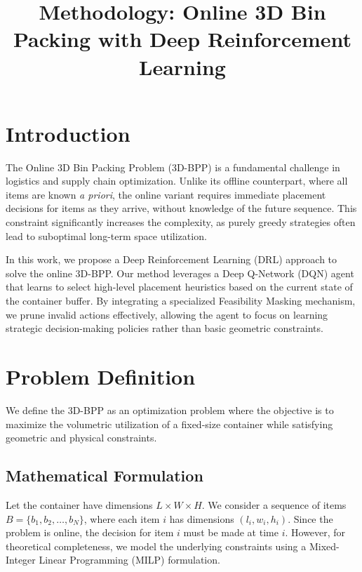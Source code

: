 \documentclass{article}
\title{Methodology: Online 3D Bin Packing with Deep Reinforcement Learning}
\author{}
\date{}
\begin{document}
\maketitle

\section{Introduction}
The Online 3D Bin Packing Problem (3D-BPP) is a fundamental challenge in logistics and supply chain optimization. Unlike its offline counterpart, where all items are known \textit{a priori}, the online variant requires immediate placement decisions for items as they arrive, without knowledge of the future sequence. This constraint significantly increases the complexity, as purely greedy strategies often lead to suboptimal long-term space utilization.

In this work, we propose a Deep Reinforcement Learning (DRL) approach to solve the online 3D-BPP. Our method leverages a Deep Q-Network (DQN) agent that learns to select high-level placement heuristics based on the current state of the container buffer. By integrating a specialized Feasibility Masking mechanism, we prune invalid actions effectively, allowing the agent to focus on learning strategic decision-making policies rather than basic geometric constraints.

\section{Problem Definition}
We define the 3D-BPP as an optimization problem where the objective is to maximize the volumetric utilization of a fixed-size container while satisfying geometric and physical constraints.

\subsection{Mathematical Formulation}
Let the container have dimensions $L \times W \times H$. We consider a sequence of items $B = \{b_1, b_2, \dots, b_N\}$, where each item $i$ has dimensions $(l_i, w_i, h_i)$.
Since the problem is online, the decision for item $i$ must be made at time $i$. However, for theoretical completeness, we model the underlying constraints using a Mixed-Integer Linear Programming (MILP) formulation.
\end{document}
